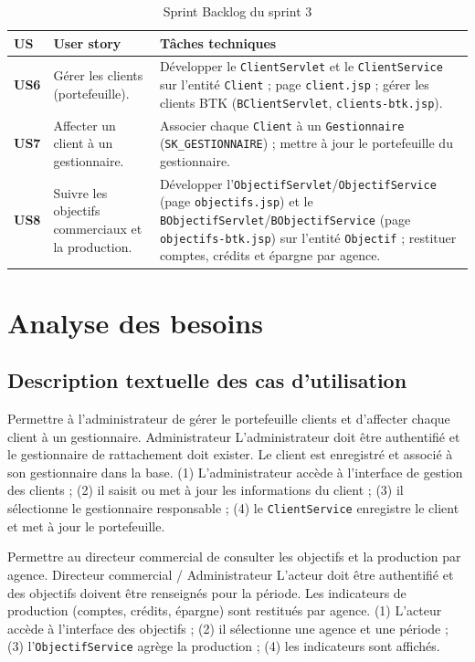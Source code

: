 \begin{table}[htbp]
\centering
\caption{Sprint Backlog du sprint 3}
\label{tab:bl_s3}
\renewcommand{\arraystretch}{1.3}
\begin{tabularx}{\textwidth}{>{\bfseries}p{1cm}p{5.2cm}X}
\toprule
\textmd{\textbf{US}} & \textbf{User story} & \textbf{Tâches techniques}\\
\midrule
US6 & Gérer les clients (portefeuille). &
Développer le \texttt{ClientServlet} et le \texttt{ClientService} sur l'entité
\texttt{Client} ; page \texttt{client.jsp} ; gérer les clients BTK
(\texttt{BClientServlet}, \texttt{clients-btk.jsp}).\\
\midrule
US7 & Affecter un client à un gestionnaire. &
Associer chaque \texttt{Client} à un \texttt{Gestionnaire}
(\texttt{SK\_GESTIONNAIRE}) ; mettre à jour le portefeuille du gestionnaire.\\
\midrule
US8 & Suivre les objectifs commerciaux et la production. &
Développer l'\texttt{ObjectifServlet}/\texttt{ObjectifService} (page
\texttt{objectifs.jsp}) et le \texttt{BObjectifServlet}/\texttt{BObjectifService}
(page \texttt{objectifs-btk.jsp}) sur l'entité \texttt{Objectif} ; restituer
comptes, crédits et épargne par agence.\\
\bottomrule
\end{tabularx}
\end{table}

\section{Analyse des besoins}

\subsection{Description textuelle des cas d'utilisation}

{Permettre à l'administrateur de gérer le portefeuille clients et d'affecter
chaque client à un gestionnaire.}
{Administrateur}
{L'administrateur doit être authentifié et le gestionnaire de rattachement doit
exister.}
{Le client est enregistré et associé à son gestionnaire dans la base.}
{(1) L'administrateur accède à l'interface de gestion des clients ; (2) il saisit
ou met à jour les informations du client ; (3) il sélectionne le gestionnaire
responsable ; (4) le \texttt{ClientService} enregistre le client et met à jour le
portefeuille.}

{Permettre au directeur commercial de consulter les objectifs et la production par
agence.}
{Directeur commercial / Administrateur}
{L'acteur doit être authentifié et des objectifs doivent être renseignés pour la
période.}
{Les indicateurs de production (comptes, crédits, épargne) sont restitués par
agence.}
{(1) L'acteur accède à l'interface des objectifs ; (2) il sélectionne une agence
et une période ; (3) l'\texttt{ObjectifService} agrège la production ; (4) les
indicateurs sont affichés.}

